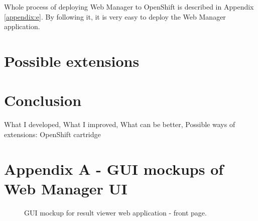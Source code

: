 \documentclass[11pt,oneside,final]{fithesis2}
\begin{document}
  Whole process of deploying Web Manager to OpenShift is described in Appendix \ref{appendix:e}. By following it, it is very easy
  to deploy the Web Manager application.
  
\chapter{Possible extensions}
\label{sec:plannedExtensions}
  
\chapter{Conclusion}
What I developed, What I improved, What can be better, Possible ways of extensions: OpenShift cartridge

\appendix
\chapter{Appendix A - GUI mockups of Web Manager UI}
\label{appendeix:a}

\begin{figure}[!htb]
    \begin{center}
    \leavevmode
    \centerline{}
    \end{center}
    \caption{GUI mockup for result viewer web application - front page.}
    \label{fig:frontPageMock}
\end{figure}
\end{document}
